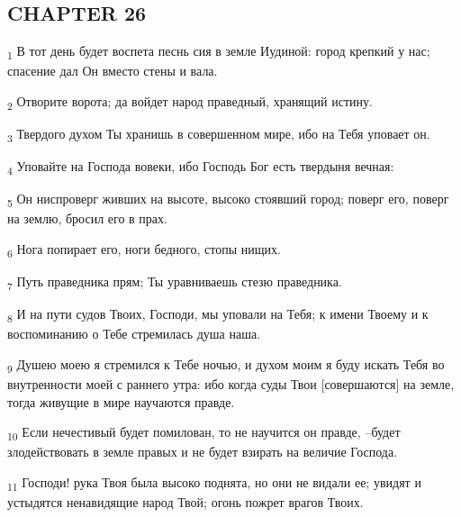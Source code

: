 \subsection{CHAPTER 26}
\begin{tcolorbox}
\textsubscript{1} В тот день будет воспета песнь сия в земле Иудиной: город крепкий у нас; спасение дал Он вместо стены и вала.
\end{tcolorbox}
\begin{tcolorbox}
\textsubscript{2} Отворите ворота; да войдет народ праведный, хранящий истину.
\end{tcolorbox}
\begin{tcolorbox}
\textsubscript{3} Твердого духом Ты хранишь в совершенном мире, ибо на Тебя уповает он.
\end{tcolorbox}
\begin{tcolorbox}
\textsubscript{4} Уповайте на Господа вовеки, ибо Господь Бог есть твердыня вечная:
\end{tcolorbox}
\begin{tcolorbox}
\textsubscript{5} Он ниспроверг живших на высоте, высоко стоявший город; поверг его, поверг на землю, бросил его в прах.
\end{tcolorbox}
\begin{tcolorbox}
\textsubscript{6} Нога попирает его, ноги бедного, стопы нищих.
\end{tcolorbox}
\begin{tcolorbox}
\textsubscript{7} Путь праведника прям; Ты уравниваешь стезю праведника.
\end{tcolorbox}
\begin{tcolorbox}
\textsubscript{8} И на пути судов Твоих, Господи, мы уповали на Тебя; к имени Твоему и к воспоминанию о Тебе стремилась душа наша.
\end{tcolorbox}
\begin{tcolorbox}
\textsubscript{9} Душею моею я стремился к Тебе ночью, и духом моим я буду искать Тебя во внутренности моей с раннего утра: ибо когда суды Твои [совершаются] на земле, тогда живущие в мире научаются правде.
\end{tcolorbox}
\begin{tcolorbox}
\textsubscript{10} Если нечестивый будет помилован, то не научится он правде, --будет злодействовать в земле правых и не будет взирать на величие Господа.
\end{tcolorbox}
\begin{tcolorbox}
\textsubscript{11} Господи! рука Твоя была высоко поднята, но они не видали ее; увидят и устыдятся ненавидящие народ Твой; огонь пожрет врагов Твоих.
\end{tcolorbox}
